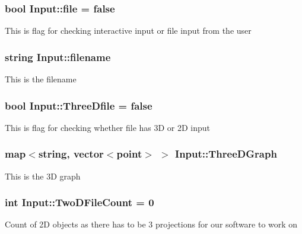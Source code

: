 \subsubsection[{\texorpdfstring{file}{file}}]{\setlength{\rightskip}{0pt plus 5cm}bool Input\+::file = false}\hypertarget{classInput_ad073fa115ead2e8b7492214215ebd22d}{}\label{classInput_ad073fa115ead2e8b7492214215ebd22d}
This is flag for checking interactive input or file input from the user 
\subsubsection[{\texorpdfstring{filename}{filename}}]{\setlength{\rightskip}{0pt plus 5cm}string Input\+::filename}\hypertarget{classInput_af296359065236ac9139aab7736d6844d}{}\label{classInput_af296359065236ac9139aab7736d6844d}
This is the filename 
\subsubsection[{\texorpdfstring{Three\+Dfile}{ThreeDfile}}]{\setlength{\rightskip}{0pt plus 5cm}bool Input\+::\+Three\+Dfile = false}\hypertarget{classInput_aacb0e034125e32179081a97eecab47df}{}\label{classInput_aacb0e034125e32179081a97eecab47df}
This is flag for checking whether file has 3D or 2D input 
\subsubsection[{\texorpdfstring{Three\+D\+Graph}{ThreeDGraph}}]{\setlength{\rightskip}{0pt plus 5cm}map$<$string, vector$<${\bf point}$>$ $>$ Input\+::\+Three\+D\+Graph}\hypertarget{classInput_aed882deebbb45d8423e5477e8ccaee60}{}\label{classInput_aed882deebbb45d8423e5477e8ccaee60}
This is the 3D graph 
\subsubsection[{\texorpdfstring{Two\+D\+File\+Count}{TwoDFileCount}}]{\setlength{\rightskip}{0pt plus 5cm}int Input\+::\+Two\+D\+File\+Count = 0}\hypertarget{classInput_a82141fe9142aec447f9ef52fd2f78c73}{}\label{classInput_a82141fe9142aec447f9ef52fd2f78c73}
Count of 2D objects as there has to be 3 projections for our software to work on 
